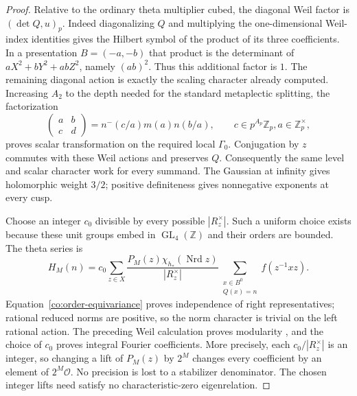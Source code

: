 \begin{proof}
Relative to the ordinary theta multiplier cubed, the diagonal Weil
factor is $(\det Q,u)_p$.  Indeed diagonalizing $Q$ and multiplying
the one-dimensional Weil-index identities
\cite[II, nos.~25, 28]{Weil1964} gives the Hilbert symbol
of the product of its three coefficients.  In a presentation
$B=(-a,-b)$ that product is the determinant of
$aX^2+bY^2+abZ^2$, namely $(ab)^2$.  Thus this additional factor is
$1$.  The remaining diagonal action is exactly the scaling character
already computed.  Increasing $A_2$ to the depth needed for the
standard metaplectic splitting, the factorization
\[
 \begin{pmatrix}a&b\\c&d\end{pmatrix}
    =n^-(c/a)m(a)n(b/a),\qquad c\in p^{A_p}\mathbb Z_p, a\in\mathbb Z_p^\times,
\]
proves scalar transformation on the required local $\Gamma_0$.
Conjugation by $z$ commutes with these Weil actions and preserves $Q$.
Consequently the same level and scalar character work for every
summand.  The Gaussian at infinity gives holomorphic weight $3/2$;
positive definiteness gives nonnegative exponents at every cusp.

Choose an integer $c_0$ divisible by every possible $|R_z^\times|$.
Such a uniform choice exists because these unit groups embed in
$\operatorname{GL}_4(\mathbb Z)$ and their orders are bounded.
The theta series is
\begin{equation}\label{co:theta-sum}
 H_M(n)=c_0\sum_{z\in X}
  \frac{P_M(z)\chi_{h_*}(\operatorname{Nrd}z)}{|R_z^\times|}
  \sum_{\substack{x\in B^0\\Q(x)=n}} f(z^{-1}xz).
\end{equation}
Equation~\eqref{co:order-equivariance} proves independence of right
representatives; rational reduced norms are positive, so the norm
character is trivial on the left rational action.  The preceding Weil
calculation proves modularity \cite[III, Theorem~6]{Weil1964}, and
the choice of $c_0$ proves integral Fourier coefficients.  More
precisely, each $c_0/|R_z^\times|$ is an integer, so changing a lift
of $P_M(z)$ by $2^M$ changes every coefficient by an element of
$2^M\mathcal O$.  No precision is lost to a stabilizer denominator.
The chosen integer lifts need satisfy no characteristic-zero
eigenrelation.


\end{proof}
